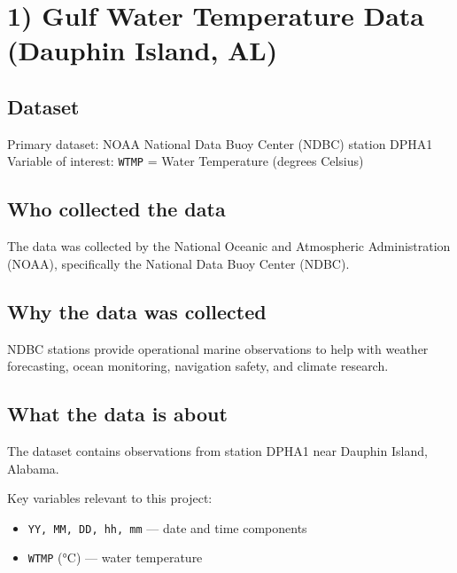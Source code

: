 \documentclass[
  letterpaper,
  DIV=11,
  numbers=noendperiod]{scrreprt}
\providecommand{\tightlist}{%
  \setlength{\itemsep}{0pt}\setlength{\parskip}{0pt}}
\begin{document}

\section{1) Gulf Water Temperature Data (Dauphin Island,
AL)}\label{gulf-water-temperature-data-dauphin-island-al}

\subsection{Dataset}\label{dataset}

Primary dataset: NOAA National Data Buoy Center (NDBC) station DPHA1
Variable of interest: \texttt{WTMP} = Water Temperature (degrees
Celsius)

\subsection{Who collected the data}\label{who-collected-the-data}

The data was collected by the National Oceanic and Atmospheric
Administration (NOAA), specifically the National Data Buoy Center
(NDBC).

\subsection{Why the data was
collected}\label{why-the-data-was-collected}

NDBC stations provide operational marine observations to help with
weather forecasting, ocean monitoring, navigation safety, and climate
research.

\subsection{What the data is about}\label{what-the-data-is-about}

The dataset contains observations from station DPHA1 near Dauphin
Island, Alabama.

Key variables relevant to this project:

\begin{itemize}
\tightlist
\item
  \texttt{YY,\ MM,\ DD,\ hh,\ mm} --- date and time components\\
\item
  \texttt{WTMP} (°C) --- water temperature
\end{itemize}
\end{document}
